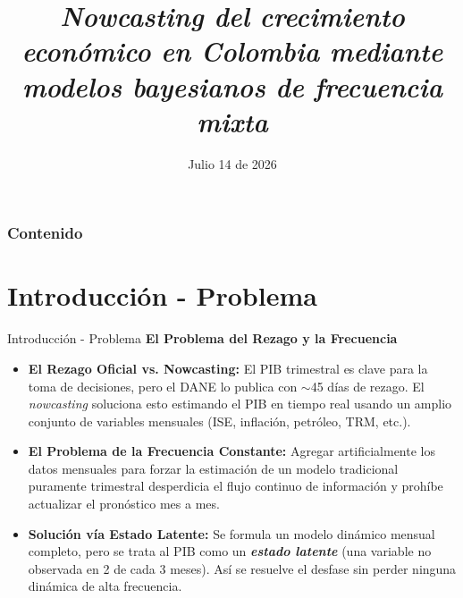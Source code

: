 \documentclass{beamer}
\title[35° Simposio Internacional de Estadística]{\textit{\textbf{Nowcasting} del crecimiento económico en Colombia mediante modelos bayesianos de frecuencia mixta}}
\author[Moreno, Olivero y Campo (2026). Nowcasting bayesiano]{Juan Diego Moreno Sánchez \inst{1} \and \and Zeneth Olivero Tapia \inst{2} \\[0.1cm]
\and Jacobo Campo Robledo \inst{1, 2}}
\institute[Universidad Externado de Colombia -- Universidad Católica de Colombia]
{ 
		\inst{1} Universidad Externado de Colombia
		\and 	
		\inst{2} Universidad Católica de Colombia
}
\date{\footnotesize{Julio 14 de 2026}}
\begin{document}
\begin{frame}
	\titlepage
\end{frame}

\begin{frame}
	\frametitle{Contenido}
\end{frame}


\section{Introducción - Problema}

\begin{frame}{Introducción - Problema}
\textcolor[rgb]{0,0,1}{\textbf{El Problema del Rezago y la Frecuencia}} 
\begin{itemize}\justifying
    \item \textbf{El Rezago Oficial vs. Nowcasting:} El PIB trimestral es clave para la toma de decisiones, pero el DANE lo publica con $\sim$45 días de rezago. El \textit{nowcasting} soluciona esto estimando el PIB en tiempo real usando un amplio conjunto de variables mensuales (ISE, inflación, petróleo, TRM, etc.). \pause
    \item \textbf{El Problema de la Frecuencia Constante:} Agregar artificialmente los datos mensuales para forzar la estimación de un modelo tradicional puramente trimestral desperdicia el flujo continuo de información y prohíbe actualizar el pronóstico mes a mes. \pause
    \item \textbf{Solución vía Estado Latente:} Se formula un modelo dinámico mensual completo, pero se trata al PIB como un \textbf{\textit{estado latente}} (una variable no observada en 2 de cada 3 meses). Así se resuelve el desfase sin perder ninguna dinámica de alta frecuencia.
\end{itemize}
\end{frame}
\end{document}
